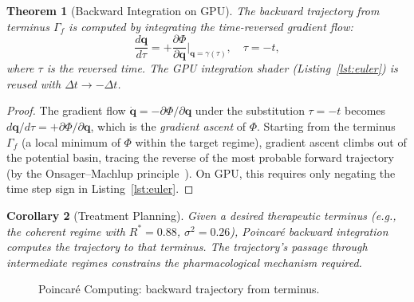 \documentclass[11pt,twocolumn,a4paper]{article}
\newtheorem{theorem}{Theorem}[section]
\newtheorem{corollary}[theorem]{Corollary}
\newcommand{\Pot}{\Phi}
\newcommand{\qvec}{\mathbf{q}}
\begin{document}
\begin{theorem}[Backward Integration on GPU]
\label{thm:backward}
The backward trajectory from terminus $\Gamma_f$ is computed by integrating the time-reversed gradient flow:
\begin{equation}
\frac{d\qvec}{d\tau} = +\frac{\partial \Pot}{\partial \qvec}\bigg|_{\qvec = \gamma(\tau)}, \quad \tau = -t,
\label{eq:backward}
\end{equation}
where $\tau$ is the reversed time.
The GPU integration shader (Listing~\ref{lst:euler}) is reused with $\Delta t \to -\Delta t$.
\end{theorem}

\begin{proof}
The gradient flow $\dot{\qvec} = -\partial\Pot/\partial\qvec$ under the substitution $\tau = -t$ becomes $d\qvec/d\tau = +\partial\Pot/\partial\qvec$, which is the \emph{gradient ascent} of $\Pot$.
Starting from the terminus $\Gamma_f$ (a local minimum of $\Pot$ within the target regime), gradient ascent climbs out of the potential basin, tracing the reverse of the most probable forward trajectory (by the Onsager--Machlup principle~\cite{onsager1953}).
On GPU, this requires only negating the time step sign in Listing~\ref{lst:euler}.
\end{proof}

\begin{corollary}[Treatment Planning]
Given a desired therapeutic terminus (e.g., the coherent regime with $R^* = 0.88$, $\sigma^2 = 0.26$), Poincar\'{e} backward integration computes the trajectory to that terminus.
The trajectory's passage through intermediate regimes constrains the pharmacological mechanism required.
\end{corollary}

\begin{figure}[t]
\centering
{}
\caption{Poincar\'{e} Computing: backward trajectory from terminus.}
\label{fig:poincare}
\end{figure}
\end{document}
